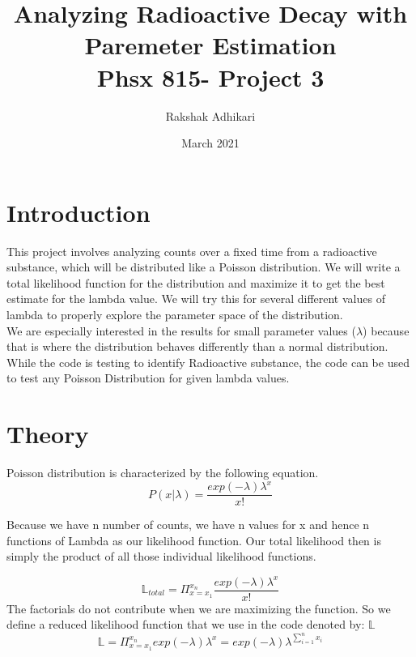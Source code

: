 \documentclass[12pt]{article}
\title {Analyzing Radioactive Decay with Paremeter Estimation \\[1ex] \large Phsx 815- Project 3}
\author{Rakshak Adhikari}
\date{March 2021}
\begin{document}
\maketitle

\section{Introduction}	
This project involves analyzing counts over a fixed time from a radioactive substance, which will be distributed like a Poisson distribution. We will write a total likelihood function for the distribution and maximize it to get the best estimate for the lambda value. We will try this for several different values of lambda to properly explore the parameter space of the distribution. \\
We are especially interested in the results for small parameter values ($\lambda$) because that is where the distribution behaves differently than a normal distribution.\\
While the code is testing to identify Radioactive substance, the code can be used to test any Poisson Distribution for given lambda values.













\section{Theory}
Poisson distribution is characterized by the following equation.\begin{equation}\label{key}
P(x|\lambda)=\dfrac{exp(-\lambda)\lambda^x}{x!}
\end{equation}

Because we have n number of counts, we have n values for x and hence n functions of Lambda as our likelihood function. Our total likelihood then is simply the product of all those individual likelihood functions. 

\begin{equation}
\mathbb{L}_{total}=\Pi_{x=x_1}^{x_n}  \dfrac{exp(-\lambda)\lambda^x}{x!} 
\end{equation}
The factorials do not contribute when we are maximizing the function. So we define a reduced likelihood function that we use in the code denoted by: $\mathbb{L}$\\
\begin{equation}\label{key}
\mathbb{L}=\Pi_{x=x_1}^{x_n}  exp(-\lambda)\lambda^x=exp(-\lambda)\lambda^{\sum_{i=1}^{n}x_i}
\end{equation}
\end{document}
